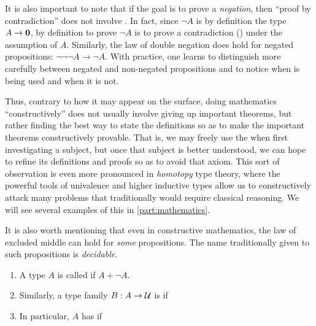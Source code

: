 It is also important to note that if the goal is to prove a \emph{negation}, then ``proof by contradiction'' does not involve \LEM{}.
In fact, since $\neg A$ is by definition the type $A\to\mathbf{0}$, by definition to prove $\neg A$ is to prove a contradiction (\emptyt) under the assumption of $A$.
Similarly, the law of double negation does hold for negated propositions: $\neg\neg\neg A \to \neg A$.
With practice, one learns to distinguish more carefully between negated and non-negated propositions and to notice when \LEM{} is being used and when it is not.

Thus, contrary to how it may appear on the surface, doing mathematics ``constructively'' does not usually involve giving up important theorems, but rather finding the best way to state the definitions so as to make the important theorems constructively provable.
That is, we may freely use the \LEM{} when first investigating a subject, but once that subject is better understood, we can hope to refine its definitions and proofs so as to avoid that axiom.
This sort of observation is even more pronounced in \emph{homotopy} type theory, where the powerful tools of univalence and higher inductive types allow us to constructively attack many problems that traditionally would require classical reasoning.
We will see several examples of this in \cref{part:mathematics}.

It is also worth mentioning that even in constructive mathematics, the law of excluded middle can hold for \emph{some} propositions.
The name traditionally given to such propositions is \emph{decidable}.

\begin{defn}\label{defn:decidable-equality}
  \mbox{}
  \begin{enumerate}
  \item A type $A$ is called 
    if $A+\neg A$.
  \item Similarly, a type family $B:A\to \mathcal{U}$ is 
    if  \label{item:decidable-equality2}
  \item In particular, $A$ has 
    if 
  \end{enumerate}
\end{defn}


